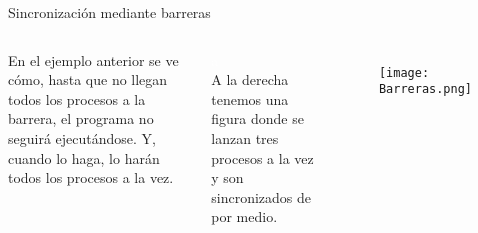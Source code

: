 \documentclass{beamer}
\begin{document}
\begin{frame}{Sincronización mediante barreras}

\begin{columns}
	En el ejemplo anterior se ve cómo, hasta que no llegan todos los procesos a la barrera, el programa no seguirá ejecutándose. Y, cuando lo haga, lo harán todos los procesos a la vez.
	
	\textcolor{white}{a\\}
	A la derecha tenemos una figura donde se lanzan tres procesos a la vez y son sincronizados de por medio.
	\begin{figure}[h]
		\centering
		\texttt{[image: Barreras.png]}
	\end{figure}
\end{columns}


	
	
\end{frame}
\end{document}
